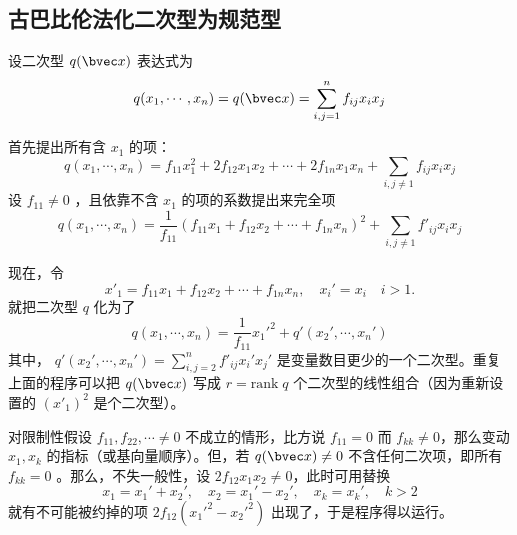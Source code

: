 \subsection{古巴比伦法化二次型为规范型}
设二次型 $q(\bvec x)$ 表达式为
\begin{equation}
q(x_1,\cdots,x_n)=q(\bvec x)=\sum\limits_{i,j=1}^n f_{ij}x_ix_j
\end{equation}

首先提出所有含 $x_1$ 的项：
\begin{equation}
q(x_1,\cdots,x_n)=f_{11} x_1^2+2f_{12}x_1x_2+\cdots+2f_{1n}x_1x_n+\sum_{i,j\neq1}f_{ij}x_ix_j
\end{equation}
设 $f_{11}\neq0$ ，且依靠不含 $x_1$ 的项的系数提出来完全项
\begin{equation}
q(x_1,\cdots,x_n)=\frac{1}{f_{11}}(f_{11}x_1+f_{12}x_2+\cdots+f_{1n}x_n)^2+\sum_{i,j\neq1}f'_{ij}x_ix_j
\end{equation}

现在，令
\begin{equation}
x'_1=f_{11}x_1+f_{12}x_2+\cdots+f_{1n}x_n,\quad x_i'=x_i\quad i>1.
\end{equation}
就把二次型 $q$ 化为了
\begin{equation}
q(x_1,\cdots,x_n)=\frac{1}{f_{11}}x_1'^2+q'(x_2',\cdots,x_n')
\end{equation}
其中， $q'(x_2',\cdots,x_n')=\sum\limits_{i,j=2}^nf'_{ij}x_i'x_j'$ 是变量数目更少的一个二次型。重复上面的程序可以把 $q(\bvec x)$ 写成 $r=\mathrm{rank}\; q$ 个二次型的线性组合（因为重新设置的 $(x'_1)^2$ 是个二次型）。

对限制性假设 $f_{11},f_{22},\cdots\neq0$ 不成立的情形，比方说 $f_{11}=0$ 而 $f_{kk}\neq0$，那么变动 $x_1,x_k$ 的指标（或基向量顺序）。但，若 $q(\bvec x)\neq0$ 不含任何二次项，即所有 $f_{kk}=0$ 。那么，不失一般性，设 $2f_{12}x_1x_2\neq0$，此时可用替换
\begin{equation}
x_1=x_1'+x_2',\quad x_2=x_1'-x_2',\quad x_k=x_k',\quad k>2
\end{equation}
就有不可能被约掉的项 $2f_{12}(x_1'^2-x_2'^2)$ 出现了，于是程序得以运行。